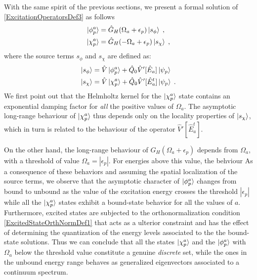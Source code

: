 \documentclass[reprint,aps,prb]{revtex4-1}
\newcommand{\eps}{\epsilon}
\newcommand{\nn}{\notag}
\newcommand{\op}[1]{\hat {#1}}
\begin{document}
With the same spirit of the previous sections, we present a formal solution of \eqref{ExcitationOperatorsDef3} as follows 
\begin{align}
\ket{\phi^a_p} &= \op G_H(\Omega_a+\eps_p)\ket{s_{\phi}} \;, \nn \\
\ket{\chi^a_p} &= \op G_H(-\Omega_a+\eps_p)\ket{s_{\chi}} \;,
\end{align}
where the source terms $s_\phi$ and $s_{\chi}$ are defined as:
\begin{align}
 \ket{s_{\phi}} &= \op V \ket{\phi^a_p} + \op Q_0 \op V'[\op E_a] \ket{\psi_p} \\
 \ket{s_{\chi}} &= \op V \ket{\chi^a_p} + \op Q_0 \op V'[\op E^t_a] \ket{\psi_p}\;.
\end{align}
We first point out that the Helmholtz kernel for the $\ket{\chi^a_p}$ state 
contains an exponential damping factor for \emph{all} the positive values of $\Omega_a$.
The asymptotic long-range behaviour of $\ket{\chi^a_p}$ thus depends only on the locality properties of 
$\ket{s_{\chi}}$, which in turn is related to the behaviour of the operator $\op V'[\op E^t_a]$.

On the other hand, the long-range behaviour of $\op G_H(\Omega_a+\eps_p)$ depends from 
$\Omega_a$, with a threshold of value $\Omega_a=|\eps_p|$. 
For energies above this value, the behviour
As a consequence of these behaviors and assuming the spatial localization of 
the source terms,  we observe that the asymptotic character of $\ket{\phi^a_p}$ changes from bound to unbound as the value of the excitation energy crosses the threshold $|\eps_p|$ while all 
the $\ket{\chi^a_p}$ states exhibit a bound-state behavior for all the values of $a$. 
Furthermore, excited states are subjected to the orthonormalization condition \eqref{ExcitedStateOrthNormDef1} that acts as a ulterior constraint and has the effect of determining the quantization 
of the energy levels associated to the the bound-state solutions. Thus we can conclude that all the states $\ket{\chi^a_p}$ and the $\ket{\phi^a_p}$ with $\Omega_a$ below the threshold value constitute 
a genuine \emph{discrete} set, while the ones in the unbound energy range behaves as generalized eigenvectors associated to a continuum spectrum. 
\end{document}
